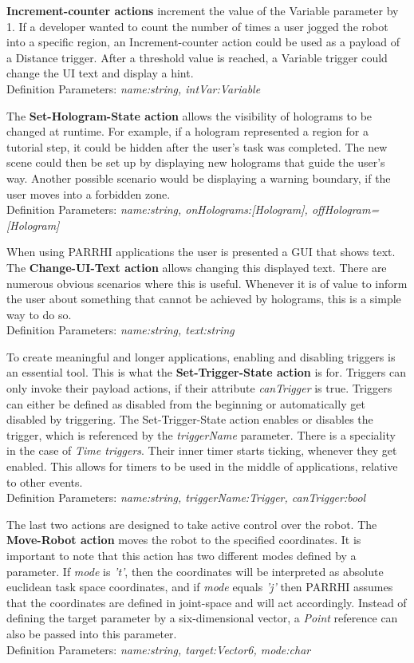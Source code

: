 \textbf{Increment-counter actions} increment the value of the Variable parameter by 1. If a developer wanted to count the number of times a user jogged the robot into a specific region, an Increment-counter action could be used as a payload of a Distance trigger. After a threshold value is reached, a Variable trigger could change the UI text and display a hint.\\Definition Parameters: \textit{name:string, intVar:Variable}

The \textbf{Set-Hologram-State action} allows the visibility of holograms to be changed at runtime. For example, if a hologram represented a region for a tutorial step, it could be hidden after the user's task was completed. The new scene could then be set up by displaying new holograms that guide the user's way. Another possible scenario would be displaying a warning boundary, if the user moves into a forbidden zone.\\Definition Parameters: \textit{name:string, onHolograms:[Hologram], offHologram=[Hologram]}

When using PARRHI applications the user is presented a GUI that shows text. The \textbf{Change-UI-Text action} allows changing this displayed text. There are numerous obvious scenarios where this is useful. Whenever it is of value to inform the user about something that cannot be achieved by holograms, this is a simple way to do so.\\Definition Parameters: \textit{name:string, text:string}

To create meaningful and longer applications, enabling and disabling triggers is an essential tool. This is what the \textbf{Set-Trigger-State action} is for. Triggers can only invoke their payload actions, if their attribute \textit{canTrigger} is true. Triggers can either be defined as disabled from the beginning or automatically get disabled by triggering. The Set-Trigger-State action enables or disables the trigger, which is referenced by the \textit{triggerName} parameter. There is a speciality in the case of \textit{Time triggers}. Their inner timer starts ticking, whenever they get enabled. This allows for timers to be used in the middle of applications, relative to other events.\\Definition Parameters: \textit{name:string, triggerName:Trigger, canTrigger:bool}

The last two actions are designed to take active control over the robot. The \textbf{Move-Robot action} moves the robot to the specified coordinates. It is important to note that this action has two different modes defined by a  parameter. If \textit{mode} is \textit{'t'}, then the coordinates will be interpreted as absolute euclidean task space coordinates, and if \textit{mode} equals \textit{'j'} then PARRHI assumes that the coordinates are defined in joint-space and will act accordingly. Instead of defining the target parameter by a six-dimensional vector, a \textit{Point} reference can also be passed into this parameter.\\Definition Parameters: \textit{name:string, target:Vector6, mode:char}

